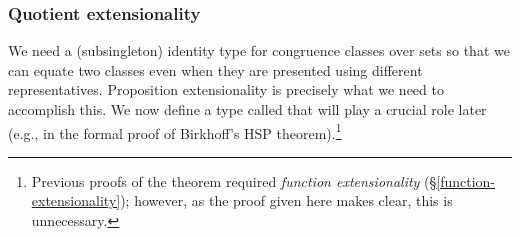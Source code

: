 \subsubsection{Quotient extensionality}\label{quotient-extensionality}

We need a (subsingleton) identity type for congruence classes over sets so that we can equate two classes even when they are presented using different representatives. Proposition extensionality is precisely what we need to accomplish this. We now define a type called  that will play a crucial role later (e.g., in the formal proof of Birkhoff's HSP theorem).\footnote{Previous proofs of the  theorem required \emph{function extensionality} (\S\ref{function-extensionality}); however, as the proof given here makes clear, this is unnecessary.}
\ccpad
